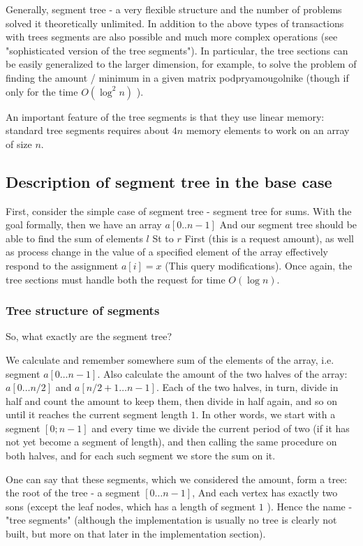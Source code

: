 Generally, segment tree - a very flexible structure and the number of problems solved it theoretically unlimited. In addition to the above types of transactions with trees segments are also possible and much more complex operations (see "sophisticated version of the tree segments"). In particular, the tree sections can be easily generalized to the larger dimension, for example, to solve the problem of finding the amount / minimum in a given matrix podpryamougolnike (though if only for the time $O (\log ^ 2 n)$ ).

An important feature of the tree segments is that they use linear memory: standard tree segments requires about $4n$ memory elements to work on an array of size $n$.

\subsection{ Description of segment tree in the base case }

First, consider the simple case of segment tree - segment tree for sums. With the goal formally, then we have an array $a [0.. n-1]$ And our segment tree should be able to find the sum of elements $l$ St to $r$ First (this is a request amount), as well as process change in the value of a specified element of the array effectively respond to the assignment $a [i] = x$ (This query modifications). Once again, the tree sections must handle both the request for time $O (\log n)$.

\subsubsection{ Tree structure of segments }

So, what exactly are the segment tree?

We calculate and remember somewhere sum of the elements of the array, i.e. segment $a [0 \ldots n-1]$. Also calculate the amount of the two halves of the array: $a [0 \ldots n / 2]$ and $a [n / 2 +1 \ldots n-1]$. Each of the two halves, in turn, divide in half and count the amount to keep them, then divide in half again, and so on until it reaches the current segment length $1$. In other words, we start with a segment $[0; n-1]$ and every time we divide the current period of two (if it has not yet become a segment of length), and then calling the same procedure on both halves, and for each such segment we store the sum on it.

One can say that these segments, which we considered the amount, form a tree: the root of the tree - a segment $[0 \ldots n-1]$, And each vertex has exactly two sons (except the leaf nodes, which has a length of segment $1$ ). Hence the name - "tree segments" (although the implementation is usually no tree is clearly not built, but more on that later in the implementation section).

